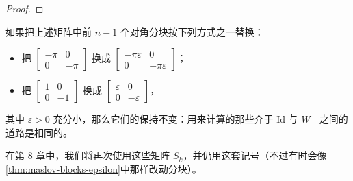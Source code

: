 \begin{proof}
\end{proof}

\begin{remark}\label{thm:maslov-blocks-epsilon}
如果把上述矩阵中前 $n-1$ 个对角分块按下列方式之一替换：
\begin{itemize}
\item 把 $\begin{bmatrix}-\pi&0\\0&-\pi\end{bmatrix}$ 换成 $\begin{bmatrix}-\pi\varepsilon&0\\0&-\pi\varepsilon\end{bmatrix}$；
\item 把 $\begin{bmatrix}1&0\\0&-1\end{bmatrix}$ 换成 $\begin{bmatrix}\varepsilon&0\\0&-\varepsilon\end{bmatrix}$，
\end{itemize}
其中 $\varepsilon>0$ 充分小，那么它们的\trMaslovIndex{}保持不变：用来计算\trMaslovIndex{}的那些介于 $\mathrm{Id}$ 与 $W^{\pm}$ 之间的道路是相同的。
\end{remark}

在第 8 章中，我们将再次使用这些矩阵 $S_k$，并仍用这套记号（不过有时会像\cref{thm:maslov-blocks-epsilon}中那样改动分块）。
